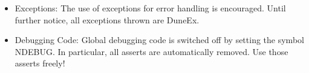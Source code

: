 \begin{itemize}
\begin{itemize}
\item Method Parameters (in / out)
\item Template Parameters
\item Return Values 
\item Exceptions thrown by a method
 \end{itemize}
     Since we all know that writing documentation is not well-liked and is frequently defered to some vague 
'next week', we herewith proclaim the Doc-Me Dogma . It goes like this: Whatever you do, and in whatever hurry you 
happen to be, please document everything at least with a {\verb /** $\backslash$todo Please doc me! */}. That way at least the absence 
of documentation is documented, and it is easier to get rid of it systematically.
\item Exceptions:
      The use of exceptions for error handling is encouraged. Until further notice, all exceptions thrown are DuneEx.
\item Debugging Code:
      Global debugging code is switched off by setting the symbol NDEBUG. In particular, all asserts are 
automatically removed. Use those asserts freely!
\end{itemize}
